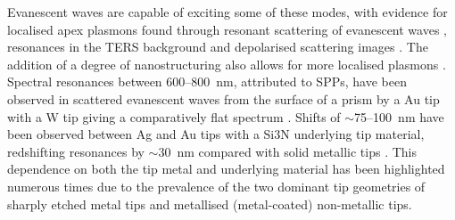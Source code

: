 \documentclass{article}
\begin{document}
Evanescent waves are capable of exciting some of these modes, with evidence for localised apex plasmons found through resonant scattering of evanescent waves \cite{neacsu2005, mehtani2006, barrios2009}, resonances in the TERS background \cite{pettinger2007, pettinger2009} and depolarised scattering images \cite{mino2014}. The addition of a degree of nanostructuring also allows for more localised plasmons \cite{hayazawa2001, bailo2008, hayazawa2012, mino2014}.
Spectral resonances between 600--\SI{800}{nm}, attributed to SPPs, have been observed in scattered evanescent waves from the surface of a prism by a Au tip with a W tip giving a comparatively flat spectrum \cite{neacsu2005}. Shifts of $\sim$75--\SI{100}{nm} have been observed between Ag and Au tips with a Si\subs3N underlying tip material, redshifting resonances by $\sim$\SI{30}{nm} compared with solid metallic tips \cite{mehtani2006, barrios2009}. This dependence on both the tip metal and underlying material has been highlighted numerous times due to the prevalence of the two dominant tip geometries of sharply etched metal tips and metallised (metal-coated) non-metallic tips.
\end{document}
